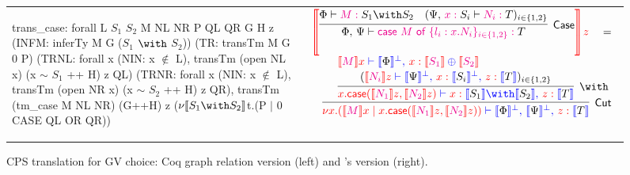 \begin{figure*}
\begin{tabular*}{\textwidth}{lc}
\begin{coq}
trans_case:
  forall L $S_1$ $S_2$ M NL NR P QL QR G H z
         (INFM: inferTy M G ($S_1$ $\with$ $S_2$))
         (TR: transTm M G 0 P)
         (TRNL: forall x (NIN: x $\notin$ L),
                  transTm (open NL x) (x $\sim$ $S_1$ ++ H) z QL)
         (TRNR: forall x (NIN: x $\notin$ L),
                  transTm (open NR x) (x $\sim$ $S_2$ ++ H) z QR),
  transTm (tm_case M NL NR) (G++H) z
          ($\nu \sem{S_1 \with S_2}$t.(P $\mid$ 0 CASE QL OR QR))
\end{coq} &
\begin{math}
\begin{array}{c}
\colored
\tmSem{
    \inference{
      \Tp{\Phi} \Tpvdash \Tmof{M} \Tp{S_1 \with S_2}  &
      (\Tp{\Psi \comma \Tmof{x}S_i} \Tpvdash
         \Tmof{N_i} \Tp{T})_{\Tp{i \in \set{1,2}}}
    }{Case}{
      \Tp{\Phi \comma \Psi} \Tpvdash
        \Tmof{\key{case}~M~\key{of}~\set{ l_i : x . N_i }_{i \in \set{1,2}}}
           \Tp{T}
    }
}\tm{z}
\quad = \hfill \\ \hfill
\colored
  \inference{
    \tm{\tmsem{M}x} \tpvdash
      \tp{\tpsem{\Phi}^\bot \comma \tmof{x}\tmsem{S_1}\oplus\tmsem{S_2}}
    \\ \vspace{0.1cm} \\
    \inference{
      (\tm{\tmsem{N_i}z} \tpvdash
        \tp{\tpsem{\Psi}^\bot \comma \tmof{x}\tpsem{S_i}^\bot
                               \comma \tmof{z}\tpsem{T}})_{i \in \set{1,2}}
    }{\with}{
      \tm{x.\caseterm(\tmsem{N_1}\tm{z},\tmsem{N_2}\tm{z})} \tpvdash
        \tp{\tmof{x}\tpsem{S_1}\with\tpsem{S_2} \comma \tmof{z}\tpsem{T}}
    }
  }{Cut}{
   \tm{\nu x.(\tmsem{M}x \mid
              x.\caseterm(\tmsem{N_1}\tm{z},\tmsem{N_2}\tm{z}))} \tpvdash
     \tp{\tpsem{\Phi}^\bot \comma \tpsem{\Psi}^\bot \comma \tmof{z}\tpsem{T}}
  }
\end{array}
\end{math}
\end{tabular*}
\caption{CPS translation for GV choice: Coq graph relation version (left) and
  \citeauthor{Wadler:2014}'s version (right).}
\label{fig:trans}
\end{figure*}
